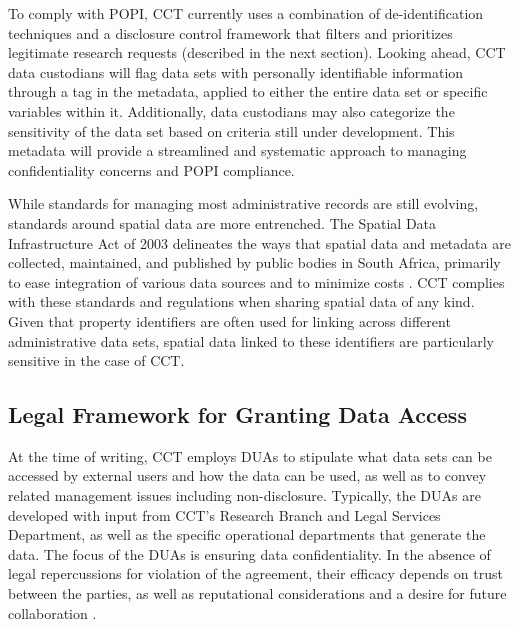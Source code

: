 To comply with POPI, CCT currently uses a combination of de-identification techniques and a disclosure control framework that filters and prioritizes legitimate research requests (described in the next section). Looking ahead, CCT data custodians will flag data sets with personally identifiable information through a tag in the metadata, applied to either the entire data set or specific variables within it. Additionally, data custodians may also categorize the sensitivity of the data set based on criteria still under development. This metadata will provide a streamlined and systematic approach to managing confidentiality concerns and POPI compliance.

While standards for managing most administrative records are still evolving, standards around spatial data are more entrenched. The Spatial Data Infrastructure Act of 2003 delineates the ways that spatial data and metadata are collected, maintained, and published by public bodies in South Africa, primarily to ease integration of various data sources and to minimize costs \citep{republicofsouthafrica2003}. CCT complies with these standards and regulations when sharing spatial data of any kind. Given that property identifiers are often used for linking across different administrative data sets, spatial data linked to these identifiers are particularly sensitive in the case of CCT.

\hypertarget{legal-framework-for-granting-data-access-5}{%
\subsection{Legal Framework for Granting Data Access}\label{legal-framework-for-granting-data-access-5}}

At the time of writing, CCT employs DUAs to stipulate what data sets can be accessed by external users and how the data can be used, as well as to convey related management issues including non-disclosure. Typically, the DUAs are developed with input from CCT's Research Branch and Legal Services Department, as well as the specific operational departments that generate the data. The focus of the DUAs is ensuring data confidentiality. In the absence of legal repercussions for violation of the agreement, their efficacy depends on trust between the parties, as well as reputational considerations and a desire for future collaboration \citep{sexton2017}.

